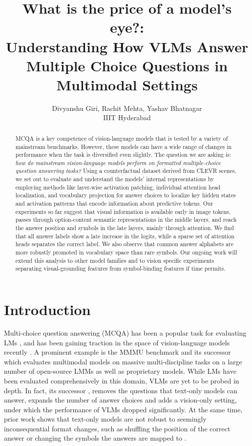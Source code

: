 \documentclass[11pt]{article}
\title{What is the price of a model's eye?:\\ Understanding How VLMs Answer Multiple Choice Questions in Multimodal Settings}
\author{Divyanshu Giri, Rachit Mehta, Yashav Bhatnagar \\
        IIIT Hyderabad}
\begin{document}
\maketitle
\begin{abstract}
MCQA is a key competence of vision-language models that is tested by a variety of mainstream benchmarks. However, these models can have a wide range of changes in performance when the task is diversified even slightly. The question we are asking is: \textit{how do mainstream vision-language models perform on formatted multiple-choice question answering tasks?} Using a counterfactual dataset derived from CLEVR scenes,  we set out to evaluate and understand the models' internal representations by employing methods like layer-wise activation patching, individual attention head localization, and vocabulary projection for answer choices to localize key hidden states and activation patterns that encode information about predictive tokens. Our experiments so far suggest that visual information is available early in image tokens, passes through option-content semantic representations in the middle layers, and reach the answer position and symbols in the late layers, mainly through attention. We find that all answer labels show a late increase in the logits, while a sparse set of attention heads separates the correct label. We also observe that common answer alphabets are more robustly promoted in vocabulary space than rare symbols. Our ongoing work will extend this analysis to other model families and to vision specific experiments separating visual-grounding features from symbol-binding features if time permits.
\end{abstract}

\section{Introduction}

Multi-choice question answering (MCQA) has been a popular task for evaluating LMs \cite{wiegreffe2025answerassembleaceunderstanding}, and has been gaining traction in the space of vision-language models recently \cite{meng2024mmiumultimodalmultiimageunderstanding}. A prominent example is the MMMU benchmark \cite{yue2024mmmumassivemultidisciplinemultimodal} and its successor \cite{yue2025mmmuprorobustmultidisciplinemultimodal} which evaluates multimodal models on massive multi-discipline tasks on a large number of open-source LMMs as well as proprietary models. While LMs have been evaluated comprehensively in this domain, VLMs are yet to be probed in depth. In fact, its successor \cite{yue2025mmmuprorobustmultidisciplinemultimodal}, removes the questions that text-only models can answer, expands the number of answer choices and adds a vision-only setting, under which the performance of VLMs dropped significantly. At the same time, prior work shows that text-only models are not robust to seemingly inconsequential format changes, such as shuffling the position of the correct answer or changing the symbols the answers are mapped to \cite{wiegreffe2025answerassembleaceunderstanding}.
\end{document}
